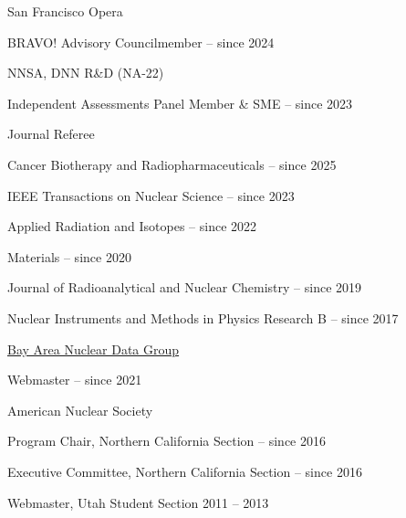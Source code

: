\begin{list1}
\item[] San Francisco Opera
\begin{list2}
\item BRAVO! Advisory Councilmember \hfill{ -- since 2024}
\end{list2}
\item[] NNSA, DNN R\&D (NA-22)
\begin{list2}
\item Independent Assessments Panel Member \& SME \hfill{ -- since 2023}
\end{list2}
\item[] Journal Referee
\begin{list2}
\item Cancer Biotherapy and Radiopharmaceuticals \hfill{ -- since 2025}
\item IEEE Transactions on Nuclear Science \hfill{ -- since 2023}
\item Applied Radiation and Isotopes \hfill{ -- since 2022}
\item Materials \hfill{ -- since 2020}
\item Journal of Radioanalytical and Nuclear Chemistry \hfill{ -- since 2019}
\item Nuclear Instruments and Methods in Physics Research B   \hfill{ -- since 2017}
\end{list2}
\item[] \href{https://nucleardata.berkeley.edu/}{Bay Area Nuclear Data Group}
\begin{list2}
\item Webmaster   \hfill{ -- since 2021}
\end{list2}
\item[] American Nuclear Society  
\begin{list2}
\item Program Chair, Northern California Section \hfill{ -- since 2016}
\item Executive Committee, Northern California Section \hfill{ -- since 2016}
\item Webmaster, Utah Student Section \hfill{2011 --  2013}
\end{list2}
\end{list1}
